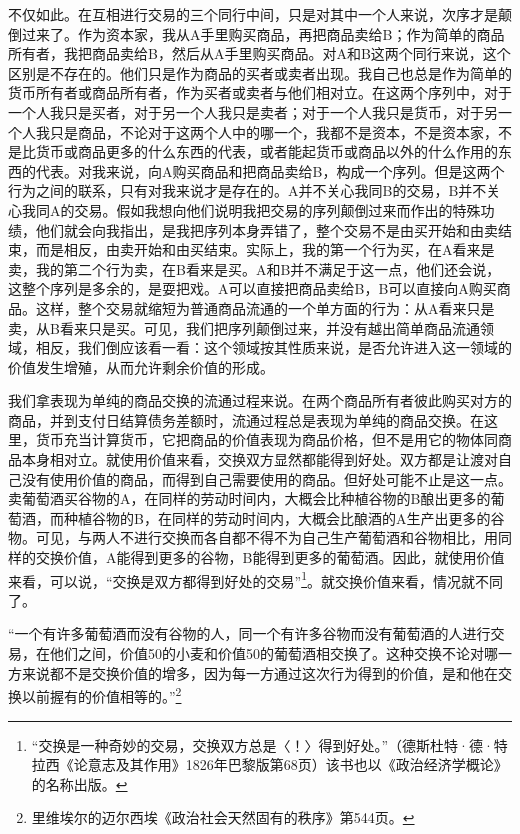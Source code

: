 \documentclass{ctexbook}
\begin{document}
    不仅如此。在互相进行交易的三个同行中间，只是对其中一个人来说，次序才是颠倒过来了。作为资本家，我从A手里购买商品，再把商品卖给B；作为简单的商品所有者，我把商品卖给B，然后从A手里购买商品。对A和B这两个同行来说，这个区别是不存在的。他们只是作为商品的买者或卖者出现。我自己也总是作为简单的货币所有者或商品所有者，作为买者或卖者与他们相对立。在这两个序列中，对于一个人我只是买者，对于另一个人我只是卖者；对于一个人我只是货币，对于另一个人我只是商品，不论对于这两个人中的哪一个，我都不是资本，不是资本家，不是比货币或商品更多的什么东西的代表，或者能起货币或商品以外的什么作用的东西的代表。对我来说，向A购买商品和把商品卖给B，构成一个序列。但是这两个行为之间的联系，只有对我来说才是存在的。A并不关心我同B的交易，B并不关心我同A的交易。假如我想向他们说明我把交易的序列颠倒过来而作出的特殊功绩，他们就会向我指出，是我把序列本身弄错了，整个交易不是由买开始和由卖结束，而是相反，由卖开始和由买结束。实际上，我的第一个行为买，在A看来是卖，我的第二个行为卖，在B看来是买。A和B并不满足于这一点，他们还会说，这整个序列是多余的，是耍把戏。A可以直接把商品卖给B，B可以直接向A购买商品。这样，整个交易就缩短为普通商品流通的一个单方面的行为：从A看来只是卖，从B看来只是买。可见，我们把序列颠倒过来，并没有越出简单商品流通领域，相反，我们倒应该看一看：这个领域按其性质来说，是否允许进入这一领域的价值发生增殖，从而允许剩余价值的形成。

    我们拿表现为单纯的商品交换的流通过程来说。在两个商品所有者彼此购买对方的商品，并到支付日结算债务差额时，流通过程总是表现为单纯的商品交换。在这里，货币充当计算货币，它把商品的价值表现为商品价格，但不是用它的物体同商品本身相对立。就使用价值来看，交换双方显然都能得到好处。双方都是让渡对自己没有使用价值的商品，而得到自己需要使用的商品。但好处可能不止是这一点。卖葡萄酒买谷物的A，在同样的劳动时间内，大概会比种植谷物的B酿出更多的葡萄酒，而种植谷物的B，在同样的劳动时间内，大概会比酿酒的A生产出更多的谷物。可见，与两人不进行交换而各自都不得不为自己生产葡萄酒和谷物相比，用同样的交换价值，A能得到更多的谷物，B能得到更多的葡萄酒。因此，就使用价值来看，可以说，“交换是双方都得到好处的交易”\footnote{“交换是一种奇妙的交易，交换双方总是〈！〉得到好处。”（德斯杜特·德·特拉西《论意志及其作用》1826年巴黎版第68页）该书也以《政治经济学概论》的名称出版。}。就交换价值来看，情况就不同了。

    “一个有许多葡萄酒而没有谷物的人，同一个有许多谷物而没有葡萄酒的人进行交易，在他们之间，价值50的小麦和价值50的葡萄酒相交换了。这种交换不论对哪一方来说都不是交换价值的增多，因为每一方通过这次行为得到的价值，是和他在交换以前握有的价值相等的。”\footnote{里维埃尔的迈尔西埃《政治社会天然固有的秩序》第544页。}
\end{document}

